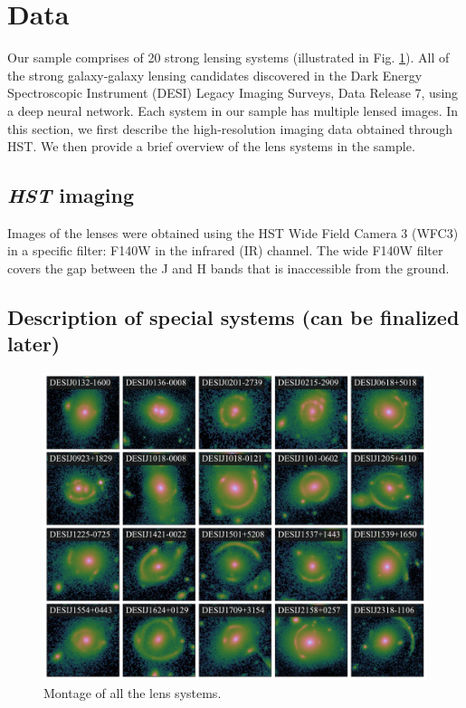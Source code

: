 \documentclass{aa}
\begin{document}
\section{Data} \label{sec:data}
Our sample comprises of 20 strong lensing systems (illustrated in Fig. \ref{fig:montage}). All of the strong galaxy-galaxy lensing candidates discovered in the Dark Energy Spectroscopic Instrument (DESI) Legacy Imaging Surveys, Data Release 7, using a deep neural network. Each system in our sample has multiple lensed images. In this section, we first describe the high-resolution imaging data obtained through HST. We then provide a brief overview of the lens systems in the sample.


\subsection{\textit{HST} imaging} 

Images of the lenses were obtained using the HST Wide Field Camera 3 (WFC3) in a specific filter: F140W in the infrared (IR) channel. The wide F140W filter covers the gap between the J and H bands that is inaccessible from the ground. 


\subsection{Description of special systems (can be finalized later)}


\begin{figure}
	\includegraphics[width=\textwidth]{figures/lens_montage.pdf}
	\caption{\label{fig:montage}
	Montage of all the lens systems.
	}
\end{figure}
\end{document}
